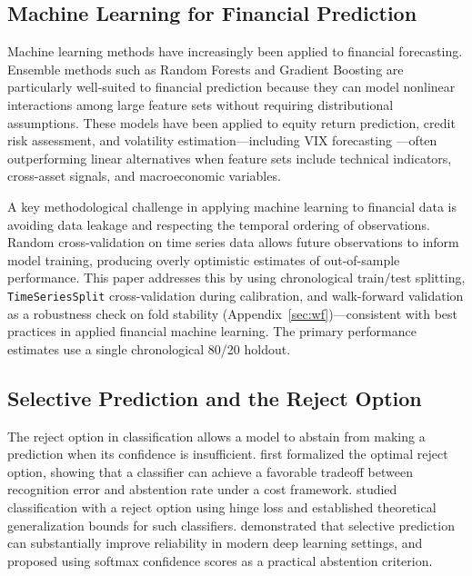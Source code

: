 \documentclass[11pt]{article}
\begin{document}
\subsection{Machine Learning for Financial Prediction}

Machine learning methods have increasingly been applied to financial forecasting. Ensemble methods such as Random Forests \citep{breiman2001} and Gradient Boosting are particularly well-suited to financial prediction because they can model nonlinear interactions among large feature sets without requiring distributional assumptions. These models have been applied to equity return prediction, credit risk assessment, and volatility estimation---including VIX forecasting \citep{fernandes2014}---often outperforming linear alternatives when feature sets include technical indicators, cross-asset signals, and macroeconomic variables.

A key methodological challenge in applying machine learning to financial data is avoiding data leakage and respecting the temporal ordering of observations. Random cross-validation on time series data allows future observations to inform model training, producing overly optimistic estimates of out-of-sample performance. This paper addresses this by using chronological train/test splitting, \texttt{TimeSeriesSplit} cross-validation during calibration, and walk-forward validation as a robustness check on fold stability (Appendix~\ref{sec:wf})---consistent with best practices in applied financial machine learning. The primary performance estimates use a single chronological 80/20 holdout.

\subsection{Selective Prediction and the Reject Option}

The reject option in classification allows a model to abstain from making a prediction when its confidence is insufficient. \citet{chow1970} first formalized the optimal reject option, showing that a classifier can achieve a favorable tradeoff between recognition error and abstention rate under a cost framework. \citet{bartlett2008} studied classification with a reject option using hinge loss and established theoretical generalization bounds for such classifiers. \citet{geifman2017} demonstrated that selective prediction can substantially improve reliability in modern deep learning settings, and proposed using softmax confidence scores as a practical abstention criterion.
\end{document}
